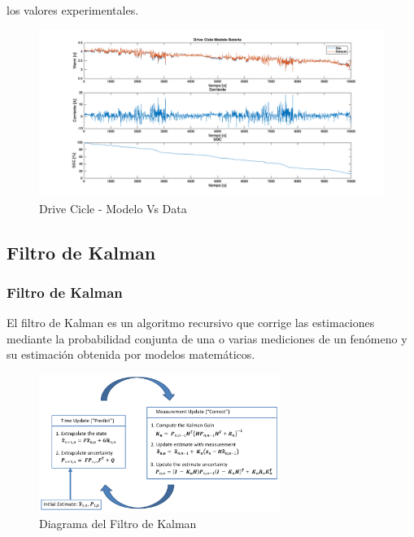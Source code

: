 \documentclass[10pt]{beamer}
\theoremstyle{remark}
\theoremstyle{definition}
\begin{document}
\begin{frame}[allowframebreaks]
  	los valores experimentales.
  	\begin{figure}[!h]
		\centering
		\includegraphics[width=0.85\linewidth]{images/Drive_Cicle_Modelo_Bateria.png}
		\caption{Drive Cicle - Modelo Vs Data}
		\label{fig:DC_modVsData}
  	\end{figure}
\end{frame}

\subsection{Filtro de Kalman}

\begin{frame}[allowframebreaks]
  	\frametitle{Filtro de Kalman}
  	El filtro de Kalman es un algoritmo recursivo que corrige las estimaciones
  	mediante la probabilidad conjunta de una o varias mediciones de un fenómeno y
  	su estimación obtenida por modelos matemáticos.
  	\begin{figure}[h!]
		\centering
		\includegraphics[width=0.7\textwidth]{images/KalmanFilterDiagram.png}
		\caption{Diagrama del Filtro de Kalman}
		\label{fig:kf_sch}
  	\end{figure}
\end{frame}
\end{document}
